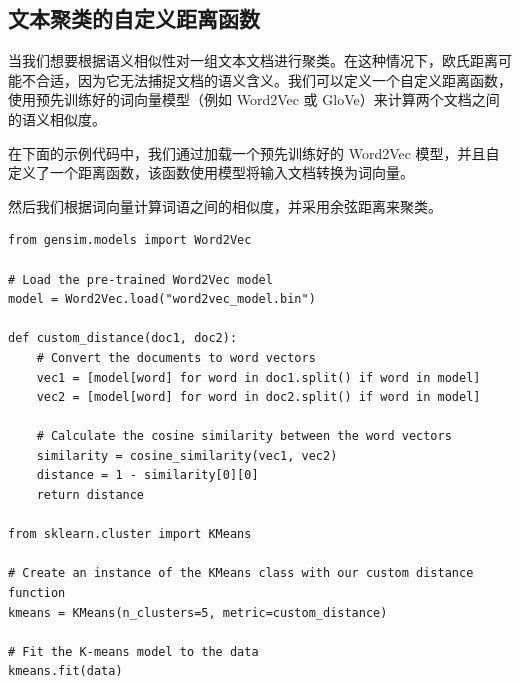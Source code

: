 \subsection{文本聚类的自定义距离函数}

\begin{example}
    当我们想要根据语义相似性对一组文本文档进行聚类。在这种情况下，欧氏距离可能不合适，因为它无法捕捉文档的语义含义。我们可以定义一个自定义距离函数，使用预先训练好的词向量模型（例如 Word2Vec 或 GloVe）来计算两个文档之间的语义相似度。
\end{example}

在下面的示例代码中，我们通过加载一个预先训练好的 Word2Vec 模型，并且自定义了一个距离函数，该函数使用模型将输入文档转换为词向量。

然后我们根据词向量计算词语之间的相似度，并采用余弦距离来聚类。

\begin{lstlisting}[style=python]
from gensim.models import Word2Vec

# Load the pre-trained Word2Vec model
model = Word2Vec.load("word2vec_model.bin")

def custom_distance(doc1, doc2):
    # Convert the documents to word vectors
    vec1 = [model[word] for word in doc1.split() if word in model]
    vec2 = [model[word] for word in doc2.split() if word in model]
    
    # Calculate the cosine similarity between the word vectors
    similarity = cosine_similarity(vec1, vec2)
    distance = 1 - similarity[0][0]
    return distance

from sklearn.cluster import KMeans

# Create an instance of the KMeans class with our custom distance function
kmeans = KMeans(n_clusters=5, metric=custom_distance)

# Fit the K-means model to the data
kmeans.fit(data)
\end{lstlisting}

